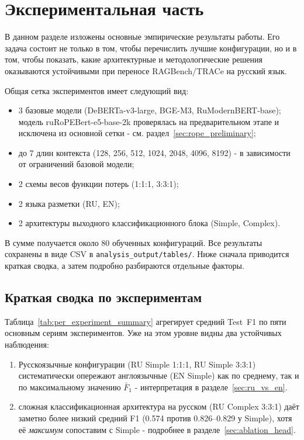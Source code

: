 \section{Экспериментальная часть}
\label{sec:experiments}

В данном разделе изложены основные эмпирические результаты работы. Его задача состоит не
только в том, чтобы перечислить лучшие конфигурации, но и в том, чтобы показать, какие
архитектурные и методологические решения оказываются устойчивыми при переносе
RAGBench/TRACe на русский язык.

Общая сетка экспериментов имеет следующий вид:
\begin{itemize}
  \item 3 базовые модели (DeBERTa-v3-large, BGE-M3, RuModernBERT-base); модель ruRoPEBert-e5-base-2k
   проверялась на предварительном этапе и исключена из основной сетки - см. раздел~\ref{sec:rope_preliminary};
  \item до 7 длин контекста (128, 256, 512, 1024, 2048, 4096, 8192) - в зависимости от
  ограничений базовой модели;
  \item 2 схемы весов функции потерь (1:1:1, 3:3:1);
  \item 2 языка разметки (RU, EN);
  \item 2 архитектуры выходного классификационного блока (Simple, Complex).
\end{itemize}
В сумме получается около 80 обученных конфигураций. Все результаты сохранены в виде CSV в
\texttt{analysis\_output/tables/}. Ниже сначала приводится краткая сводка, а затем
подробно разбираются отдельные факторы.

\subsection{Краткая сводка по экспериментам}
\label{sec:summary}

Таблица~\ref{tab:per_experiment_summary} агрегирует средний Test~F1 по пяти основным
сериям экспериментов. Уже на этом уровне видны два устойчивых наблюдения:
\begin{enumerate}
  \item Русскоязычные конфигурации (RU Simple 1:1:1, RU Simple 3:3:1) систематически
  опережают англоязычные (EN Simple) как по среднему, так и по максимальному значению $\bar{F}_1$ -
  интерпретация в разделе~\ref{sec:ru_vs_en}.
  \item сложная классификационная архитектура на русском (RU Complex 3:3:1) даёт заметно более низкий средний
   F1 (0.574 против 0.826--0.829 у Simple), хотя её \emph{максимум} сопоставим 
   с Simple - подробнее в разделе~\ref{sec:ablation_head}.
\end{enumerate}

